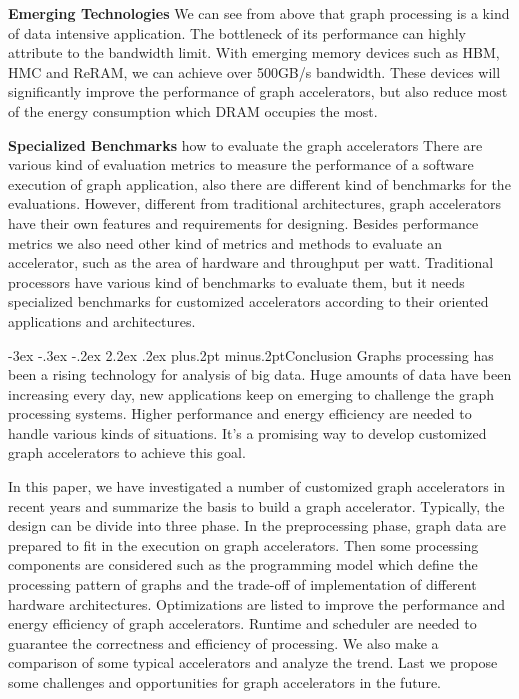 \documentclass[twoside]{article}
\makeatletter
\def\section{\@startsection{section}{1}{\z@}%
 {-3ex \@plus -.3ex \@minus -.2ex}%
 {2.2ex \@plus.2ex}%
{\normalfont\normalsize\protect\baselineskip=14.5pt plus.2pt minus.2pt\bfseries}}
\makeatother
\begin{document}
\begin{multicols}{2}
\textbf{Emerging Technologies} 
We can see from above that graph processing is a kind of data intensive application. The bottleneck of its performance can highly attribute to the bandwidth limit. With emerging memory devices such as HBM, HMC and ReRAM, we can achieve over 500GB/s bandwidth. These devices will significantly improve the performance of graph accelerators, but also reduce most of the energy consumption which DRAM occupies the most.

\textbf{Specialized Benchmarks}
{\color{red}
how to evaluate the graph accelerators
}
There are various kind of evaluation metrics to measure the performance of a software execution of graph application, also there are different kind of benchmarks for the evaluations. However, different from traditional architectures, graph accelerators have their own features and requirements for designing. Besides performance metrics we also need other kind of metrics and methods to evaluate an accelerator, such as the area of hardware and throughput per watt. Traditional processors have various kind of benchmarks to evaluate them, but it needs specialized benchmarks for customized accelerators according to their oriented applications and architectures.

\section{Conclusion}
Graphs processing has been a rising technology for analysis of big data. Huge amounts of data have been increasing every day, new applications keep on emerging to challenge the graph processing systems. Higher performance and energy efficiency are needed to handle various kinds of situations. It's a promising way to develop customized graph accelerators to achieve this goal.

In this paper, we have investigated a number of customized graph accelerators in recent years and summarize the basis to build a graph accelerator. Typically, the design can be divide into three phase. In the preprocessing phase, graph data are prepared to fit in the execution on graph accelerators. Then some processing components are considered such as the programming model which define the processing pattern of graphs and the trade-off of implementation of different hardware architectures. Optimizations are listed to improve the performance and energy efficiency of graph accelerators. Runtime and scheduler are needed to guarantee the correctness and efficiency of processing. We also make a comparison of some typical accelerators and analyze the trend. Last we propose some challenges and opportunities for graph accelerators in the future.


\end{multicols}
\end{document}

